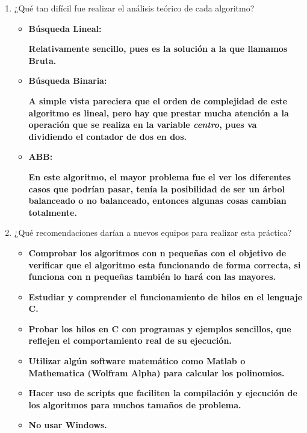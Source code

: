 \documentclass[12pt]{article}
\begin{document}
\begin{enumerate}
			        \item ¿Qué tan difícil fue realizar el análisis teórico de cada algoritmo?
			        \begin{itemize}
			            \item[\checkmark] \textbf{Búsqueda Lineal:}
			            
			                \textbf{Relativamente sencillo, pues es la solución a la que llamamos Bruta.}
			                
			            \item[\checkmark] \textbf{Búsqueda Binaria:}
			            
			                \textbf{A simple vista pareciera que el orden de complejidad de este algoritmo es lineal, pero hay que prestar mucha atención a la operación que se realiza en la variable \textit{centro}, pues va dividiendo el contador de dos en dos.}
			            
			            \item[\checkmark] \textbf{ABB: }
			            
			                \textbf{En este algoritmo, el mayor problema fue el ver los diferentes casos que podrían pasar, tenía la posibilidad de ser un árbol balanceado o no balanceado, entonces algunas cosas cambian totalmente.}
			                
			        \end{itemize}
			        \item ¿Qué recomendaciones darían a nuevos equipos para realizar esta práctica?
			        \begin{itemize}
			            \item \textbf{Comprobar los algoritmos con n pequeñas con el objetivo de verificar que el algoritmo esta funcionando de forma correcta, si funciona con n pequeñas también lo hará con las mayores.}
			            
			            \item \textbf{Estudiar y comprender el funcionamiento de hilos en el lenguaje C.}
			            
			            \item \textbf{Probar los hilos en C con programas y ejemplos sencillos, que reflejen el comportamiento real de su ejecución.}
			            
			            \item \textbf{Utilizar algún software matemático como Matlab o Mathematica (Wolfram Alpha) para calcular los polinomios.}
			            
			            \item \textbf{Hacer uso de scripts que faciliten la compilación y ejecución de los algoritmos para muchos tamaños de problema.}
			            
			            \item \textbf{No usar Windows. }
			        \end{itemize}
			    \end{enumerate}
	
\end{document}
